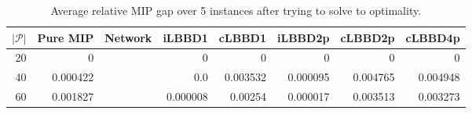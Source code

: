 \begin{table*}
    \centering
    \caption{Average relative MIP gap over 5 instances after trying to solve to optimality.}
    \begin{tabular}{rrrrrrrr} \toprule
        $|\mathcal{P}|$ & Pure MIP & Network & iLBBD1 & cLBBD1 & iLBBD2p & cLBBD2p & cLBBD4p \\ \midrule
        20              & 0 &         & 0 &  0 & 0 & 0 & 0 \\
        40              & 0.000422 &   & 0.0 & 0.003532 & 0.000095 & 0.004765 & 0.004948 \\
        60 & 0.001827 &  & 0.000008 & 0.00254 & 0.000017 & 0.003513 & 0.003273 \\
        \bottomrule
    \end{tabular}
\end{table*}
